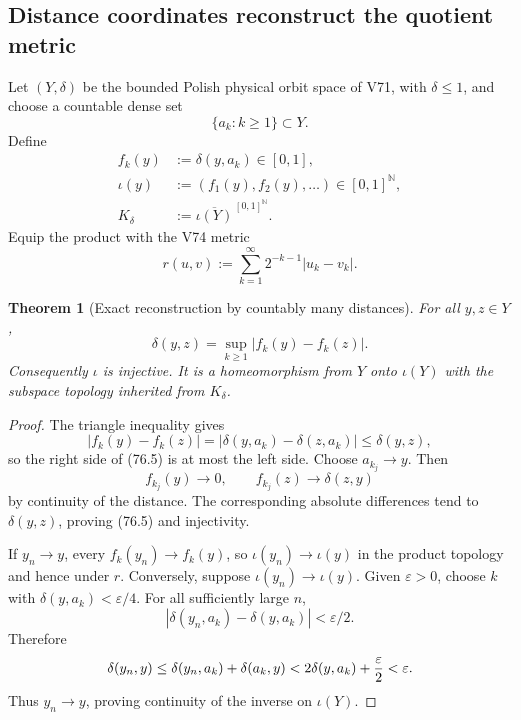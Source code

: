 \documentclass[11pt]{article}
\newtheorem{theorem}{Theorem}[section]
\theoremstyle{remark}
\begin{document}
\subsection{Distance coordinates reconstruct the quotient metric}

Let \((Y,\delta)\) be the bounded Polish physical orbit space of V71,
with \(\delta\leq1\), and choose a countable dense set
\[
                         \{a_k:k\geq1\}\subset Y.
\]
Define
\begin{align}
 f_k(y)&:=\delta(y,a_k)\in[0,1],                              \tag{76.1}\\
 \iota(y)&:=(f_1(y),f_2(y),\ldots)\in[0,1]^{\mathbb N},       \tag{76.2}\\
 K_\delta&:=\overline{\iota(Y)}^{\,[0,1]^{\mathbb N}}.       \tag{76.3}
\end{align}
Equip the product with the V74 metric
\[
 r(u,v):=\sum_{k=1}^{\infty}2^{-k-1}|u_k-v_k|.               \tag{76.4}
\]

\begin{theorem}[Exact reconstruction by countably many distances]
\label{thm:v12v76-reconstruction}
For all \(y,z\in Y\),
\begin{equation}
 \boxed{\displaystyle
 \delta(y,z)=\sup_{k\geq1}
 |f_k(y)-f_k(z)|.}                                          \tag{76.5}
\end{equation}
Consequently \(\iota\) is injective.  It is a homeomorphism from
\(Y\) onto \(\iota(Y)\) with the subspace topology inherited from
\(K_\delta\).
\end{theorem}

\begin{proof}
The triangle inequality gives
\[
 |f_k(y)-f_k(z)|
 =|\delta(y,a_k)-\delta(z,a_k)|
 \leq\delta(y,z),
\]
so the right side of (76.5) is at most the left side.  Choose
\(a_{k_j}\to y\).  Then
\[
 f_{k_j}(y)\longrightarrow0,\qquad
 f_{k_j}(z)\longrightarrow\delta(z,y)
\]
by continuity of the distance.  The corresponding absolute
differences tend to \(\delta(y,z)\), proving (76.5) and injectivity.

If \(y_n\to y\), every \(f_k(y_n)\to f_k(y)\), so
\(\iota(y_n)\to\iota(y)\) in the product topology and hence under
\(r\).  Conversely, suppose
\(\iota(y_n)\to\iota(y)\).  Given \(\varepsilon>0\), choose \(k\)
with \(\delta(y,a_k)<\varepsilon/4\).  For all sufficiently large
\(n\),
\[
 |\delta(y_n,a_k)-\delta(y,a_k)|<\varepsilon/2.
\]
Therefore
\[
 \delta(y_n,y)
 \leq\delta(y_n,a_k)+\delta(a_k,y)
 <2\delta(y,a_k)+{\varepsilon\over2}<\varepsilon.
\]
Thus \(y_n\to y\), proving continuity of the inverse on
\(\iota(Y)\).
\end{proof}
\end{document}
